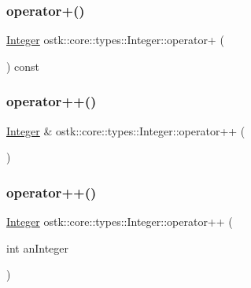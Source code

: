 \subsubsection{\texorpdfstring{operator+()}{operator+()}\hspace{0.1cm}{\footnotesize\ttfamily [4/4]}}
{\footnotesize\ttfamily \hyperlink{classostk_1_1core_1_1types_1_1_integer}{Integer} ostk\+::core\+::types\+::\+Integer\+::operator+ (\begin{DoxyParamCaption}{ }\end{DoxyParamCaption}) const}

\mbox{\label{classostk_1_1core_1_1types_1_1_integer_a8c53d280f9b065ef974a64d5635c78c6}} 
\subsubsection{\texorpdfstring{operator++()}{operator++()}\hspace{0.1cm}{\footnotesize\ttfamily [1/2]}}
{\footnotesize\ttfamily \hyperlink{classostk_1_1core_1_1types_1_1_integer}{Integer} \& ostk\+::core\+::types\+::\+Integer\+::operator++ (\begin{DoxyParamCaption}{ }\end{DoxyParamCaption})}

\mbox{\label{classostk_1_1core_1_1types_1_1_integer_a5a627e346db7f0da6565df50f19d4693}} 
\subsubsection{\texorpdfstring{operator++()}{operator++()}\hspace{0.1cm}{\footnotesize\ttfamily [2/2]}}
{\footnotesize\ttfamily \hyperlink{classostk_1_1core_1_1types_1_1_integer}{Integer} ostk\+::core\+::types\+::\+Integer\+::operator++ (\begin{DoxyParamCaption}\item[{int}]{an\+Integer }\end{DoxyParamCaption})}

